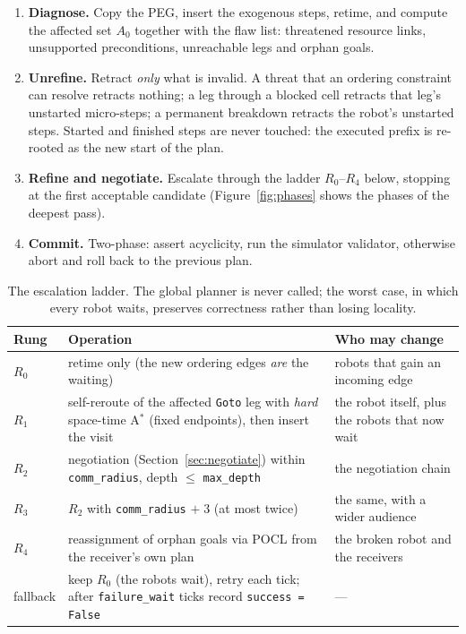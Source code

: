 \documentclass[10pt,a4paper]{article}
\newcommand{\code}[1]{\texttt{#1}}
\begin{document}
\begin{enumerate}
  \item \textbf{Diagnose.}  Copy the PEG, insert the exogenous steps, retime,
        and compute the affected set $A_0$ together with the flaw list:
        threatened resource links, unsupported preconditions, unreachable
        legs and orphan goals.
  \item \textbf{Unrefine.}  Retract \emph{only} what is invalid.  A threat
        that an ordering constraint can resolve retracts nothing; a leg
        through a blocked cell retracts that leg's unstarted micro-steps; a
        permanent breakdown retracts the robot's unstarted steps.  Started
        and finished steps are never touched: the executed prefix is
        re-rooted as the new start of the plan.
  \item \textbf{Refine and negotiate.}  Escalate through the ladder
        $R_0$--$R_4$ below, stopping at the first acceptable candidate
        (Figure~\ref{fig:phases} shows the phases of the deepest pass).
  \item \textbf{Commit.}  Two-phase: assert acyclicity, run the simulator
        validator, otherwise abort and roll back to the previous plan.
\end{enumerate}

\begin{table}[H]
\centering
\small
\setlength{\tabcolsep}{5pt}
\begin{tabularx}{\textwidth}{@{}l X X@{}}
\toprule
\textbf{Rung} & \textbf{Operation} & \textbf{Who may change}\\
\midrule
$R_0$ & retime only (the new ordering edges \emph{are} the waiting) &
  robots that gain an incoming edge\\
$R_1$ & self-reroute of the affected \code{Goto} leg with \emph{hard}
  space-time A$^\ast$ (fixed endpoints), then insert the visit &
  the robot itself, plus the robots that now wait\\
$R_2$ & negotiation (Section~\ref{sec:negotiate}) within \code{comm\_radius},
  depth $\le$ \code{max\_depth} & the negotiation chain\\
$R_3$ & $R_2$ with \code{comm\_radius} $+\;3$ (at most twice) &
  the same, with a wider audience\\
$R_4$ & reassignment of orphan goals via POCL from the receiver's own plan &
  the broken robot and the receivers\\
fallback & keep $R_0$ (the robots wait), retry each tick; after
  \code{failure\_wait} ticks record \code{success = False} & ---\\
\bottomrule
\end{tabularx}
\caption{The escalation ladder.  The global planner is never called; the
worst case, in which every robot waits, preserves correctness rather than
losing locality.}
\label{tab:ladder}
\end{table}
\end{document}
